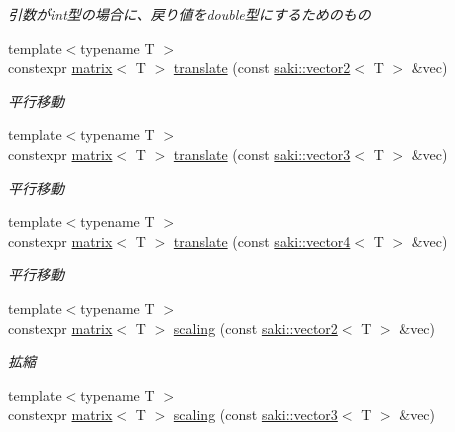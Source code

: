 \begin{DoxyCompactItemize}
\begin{DoxyCompactList}\small\item\em 引数がint型の場合に、戻り値をdouble型にするためのもの \end{DoxyCompactList}\item 
{\footnotesize template$<$typename T $>$ }\\constexpr \mbox{\hyperlink{classsaki_1_1matrix}{matrix}}$<$ T $>$ \mbox{\hyperlink{namespacesaki_a2311e77a2bed9d914a6b3e8056d6023a}{translate}} (const \mbox{\hyperlink{classsaki_1_1vector2}{saki\+::vector2}}$<$ T $>$ \&vec)
\begin{DoxyCompactList}\small\item\em 平行移動 \end{DoxyCompactList}\item 
{\footnotesize template$<$typename T $>$ }\\constexpr \mbox{\hyperlink{classsaki_1_1matrix}{matrix}}$<$ T $>$ \mbox{\hyperlink{namespacesaki_a492418470fa4dedb2065e7916460f0e0}{translate}} (const \mbox{\hyperlink{classsaki_1_1vector3}{saki\+::vector3}}$<$ T $>$ \&vec)
\begin{DoxyCompactList}\small\item\em 平行移動 \end{DoxyCompactList}\item 
{\footnotesize template$<$typename T $>$ }\\constexpr \mbox{\hyperlink{classsaki_1_1matrix}{matrix}}$<$ T $>$ \mbox{\hyperlink{namespacesaki_abdd23c2e56d1500ae2e8b662c5ddcf7c}{translate}} (const \mbox{\hyperlink{classsaki_1_1vector4}{saki\+::vector4}}$<$ T $>$ \&vec)
\begin{DoxyCompactList}\small\item\em 平行移動 \end{DoxyCompactList}\item 
{\footnotesize template$<$typename T $>$ }\\constexpr \mbox{\hyperlink{classsaki_1_1matrix}{matrix}}$<$ T $>$ \mbox{\hyperlink{namespacesaki_abda5ab30bf4dc9240857d62d56e590f9}{scaling}} (const \mbox{\hyperlink{classsaki_1_1vector2}{saki\+::vector2}}$<$ T $>$ \&vec)
\begin{DoxyCompactList}\small\item\em 拡縮 \end{DoxyCompactList}\item 
{\footnotesize template$<$typename T $>$ }\\constexpr \mbox{\hyperlink{classsaki_1_1matrix}{matrix}}$<$ T $>$ \mbox{\hyperlink{namespacesaki_affcd920fe27abc17e5fa50f04bfabe05}{scaling}} (const \mbox{\hyperlink{classsaki_1_1vector3}{saki\+::vector3}}$<$ T $>$ \&vec)

\end{DoxyCompactItemize}
